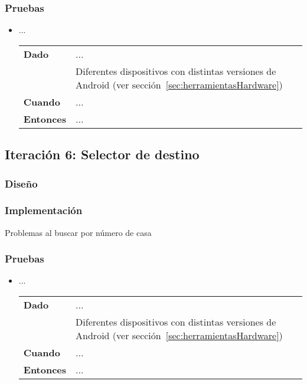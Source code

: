 \subsubsection{Pruebas}
\begin{itemize}
  \item ...

  \begin{tabular}{p{}p{}}
    \hline
    \textbf{Dado}     & ... \\
                      & Diferentes dispositivos con distintas versiones de Android (ver
                        sección~\ref{sec:herramientasHardware}) \\
    \textbf{Cuando}   & ... \\
    \textbf{Entonces} & ... \\
    \hline
  \end{tabular}
\end{itemize}

\subsection{Iteración 6: Selector de destino}
\subsubsection{Diseño}
\subsubsection{Implementación}
Problemas al buscar por número de casa
\begin{listing}[
  float=ht,
  language = java,
  caption  = {},
  label    = code:]

\end{listing}
\subsubsection{Pruebas}
\begin{itemize}
  \item ...

  \begin{tabular}{p{}p{}}
    \hline
    \textbf{Dado}     & ... \\
                      & Diferentes dispositivos con distintas versiones de Android (ver
                        sección~\ref{sec:herramientasHardware}) \\
    \textbf{Cuando}   & ... \\
    \textbf{Entonces} & ... \\
    \hline
  \end{tabular}
\end{itemize}

